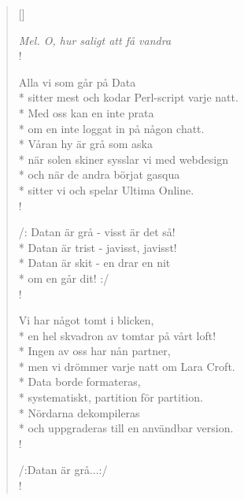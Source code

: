 \settowidth{\versewidth}{Vi kan bara räkna kvarkar}


\begin{verse}[\versewidth]

\flagverse{}
\emph{Mel. O, hur saligt att få vandra}\\!

Alla vi som går på Data\\*
sitter mest och kodar Perl-script varje natt.\\*
Med oss kan en inte prata\\*
om en inte loggat in på någon chatt.\\*
Våran hy är grå som aska\\*
när solen skiner sysslar vi med webdesign\\*
och när de andra börjat gasqua\\*
sitter vi och spelar Ultima Online.\\!


/: Datan är grå - visst är det så!\\*
Datan är trist - javisst, javisst!\\*
Datan är skit - en drar en nit\\*
om en går dit! :/\\!


Vi har något tomt i blicken,\\*
en hel skvadron av tomtar på vårt loft!\\*
Ingen av oss har nån partner,\\*
men vi drömmer varje natt om Lara Croft.\\*
Data borde formateras,\\*
systematiskt, partition för partition.\\*
Nördarna dekompileras\\*
och uppgraderas till en användbar version.\\!


/:Datan är grå...:/\\!




\end{verse}

